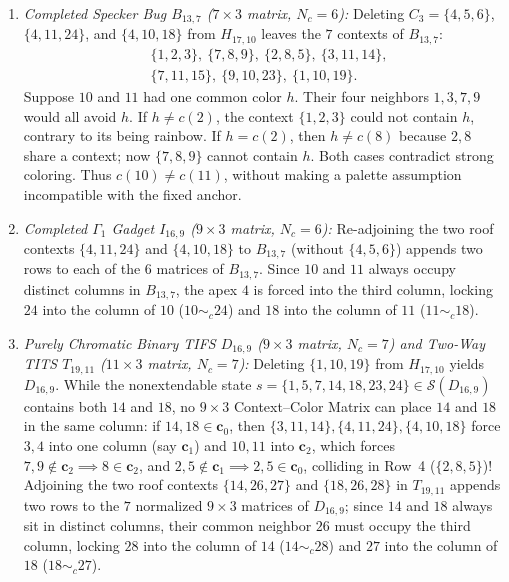 \documentclass[aps,pra,reprint,superscriptaddress,longbibliography,nofootinbib,floatfix,10pt]{revtex4-2}
\theoremstyle{definition}\newtheorem{definition}[theorem]{Definition}
\theoremstyle{remark}\newtheorem{remark}[theorem]{Remark}
\newcommand{\Sc}{\mathcal S}\newcommand{\Cc}{\mathcal C}
\begin{document}
\begin{enumerate}
\item \emph{Completed Specker Bug $B_{13,7}$ ($7\times 3$ matrix, $N_c=6$):} Deleting $C_3=\{4,5,6\}$, $\{4,11,24\}$, and $\{4,10,18\}$ from $H_{17,10}$ leaves the $7$ contexts of $B_{13,7}$:
\[
\begin{aligned}
&\{1,2,3\},\ \{7,8,9\},\ \{2,8,5\},\ \{3,11,14\},\\
&\{7,11,15\},\ \{9,10,23\},\ \{1,10,19\}.
\end{aligned}
\]
Suppose $10$ and $11$ had one common color $h$. Their four neighbors $1,3,7,9$ would all avoid $h$. If $h\ne c(2)$, the context $\{1,2,3\}$ could not contain $h$, contrary to its being rainbow. If $h=c(2)$, then $h\ne c(8)$ because $2,8$ share a context; now $\{7,8,9\}$ cannot contain $h$. Both cases contradict strong coloring. Thus $c(10)\ne c(11)$, without making a palette assumption incompatible with the fixed anchor.
\item \emph{Completed $\Gamma_1$ Gadget $I_{16,9}$ ($9\times 3$ matrix, $N_c=6$):} Re-adjoining the two roof contexts $\{4,11,24\}$ and $\{4,10,18\}$ to $B_{13,7}$ (without $\{4,5,6\}$) appends two rows to each of the $6$ matrices of $B_{13,7}$. Since $10$ and $11$ always occupy distinct columns in $B_{13,7}$, the apex $4$ is forced into the third column, locking $24$ into the column of $10$ ($10\sim_c 24$) and $18$ into the column of $11$ ($11\sim_c 18$).
\item \emph{Purely Chromatic Binary TIFS $D_{16,9}$ ($9\times 3$ matrix, $N_c=7$) and Two-Way TITS $T_{19,11}$ ($11\times 3$ matrix, $N_c=7$):} Deleting $\{1,10,19\}$ from $H_{17,10}$ yields $D_{16,9}$. While the nonextendable state $s=\{1,5,7,14,18,23,24\}\in\Sc(D_{16,9})$ contains both $14$ and $18$, no $9\times 3$ Context--Color Matrix can place $14$ and $18$ in the same column: if $14,18\in\mathbf{c}_0$, then $\{3,11,14\},\{4,11,24\},\{4,10,18\}$ force $3,4$ into one column (say $\mathbf{c}_1$) and $10,11$ into $\mathbf{c}_2$, which forces $7,9\notin\mathbf{c}_2\implies 8\in\mathbf{c}_2$, and $2,5\notin\mathbf{c}_1\implies 2,5\in\mathbf{c}_0$, colliding in Row~4 ($\{2,8,5\}$)! Adjoining the two roof contexts $\{14,26,27\}$ and $\{18,26,28\}$ in $T_{19,11}$ appends two rows to the $7$ normalized $9\times 3$ matrices of $D_{16,9}$; since $14$ and $18$ always sit in distinct columns, their common neighbor $26$ must occupy the third column, locking $28$ into the column of $14$ ($14\sim_c 28$) and $27$ into the column of $18$ ($18\sim_c 27$).
\end{enumerate}
\end{document}
